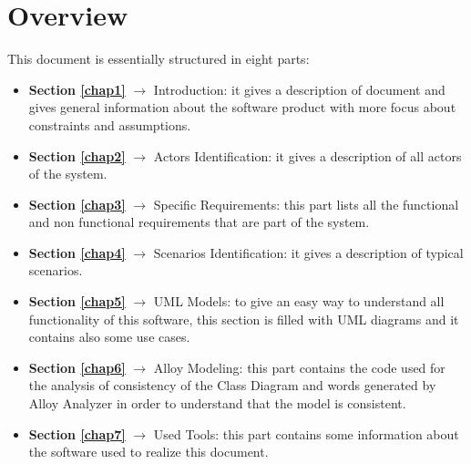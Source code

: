 \section{Overview}
This document is essentially structured in eight parts:
\begin{itemize}
	\item \textbf{Section \ref{chap1}} $\rightarrow$ Introduction: it gives a description of document and gives general information about the software product with more focus about constraints and assumptions.
	\item \textbf{Section \ref{chap2}} $\rightarrow$ Actors Identification: it gives a description of all actors of the system.
	\item \textbf{Section \ref{chap3}} $\rightarrow$ Specific Requirements: this part lists all the functional and non functional requirements that are part of the system.
	\item \textbf{Section \ref{chap4}} $\rightarrow$ Scenarios Identification: it gives a description of typical scenarios.
	\item \textbf{Section \ref{chap5}} $\rightarrow$ UML Models: to give an easy way to understand all functionality of this software, this section is filled with UML diagrams and it contains also some use cases.
	\item \textbf{Section \ref{chap6}} $\rightarrow$ Alloy Modeling: this part contains the code used for the analysis of consistency of the Class Diagram and words generated by Alloy Analyzer in order to understand that the model is consistent.
	\item \textbf{Section \ref{chap7}} $\rightarrow$ Used Tools: this part contains some information about the software used to realize this document.
\end{itemize}